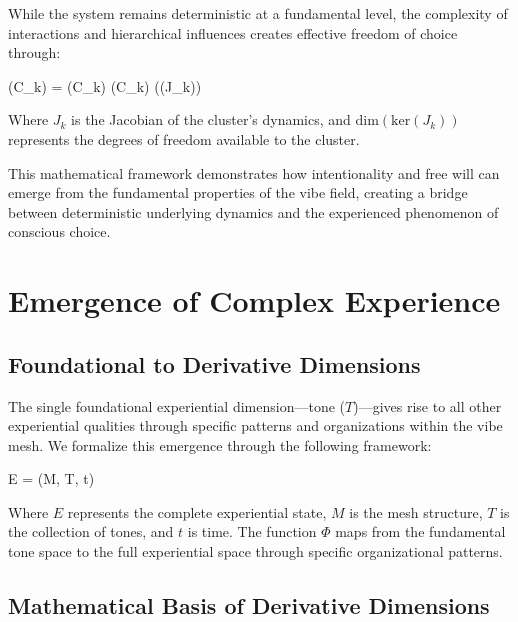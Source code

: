 \documentclass{article}
\let\oldequation\equation
\let\endoldequation\endequation
\renewenvironment{equation}{%
    \noindent\vspace{-\parskip}\vspace{-\baselineskip}%
    \oldequation
}{%
    \endoldequation
    \noindent\vspace{-\parskip}\vspace{-\baselineskip}%
}
\theoremstyle{definition}
\begin{document}
While the system remains deterministic at a fundamental level, the complexity of interactions and hierarchical influences creates effective freedom of choice through:

\begin{equation}
(C_k) = (C_k) \cdot {}(C_k) \cdot {}((J_k))
\end{equation}

Where $J_k$ is the Jacobian of the cluster's dynamics, and $\text{dim}(\text{ker}(J_k))$ represents the degrees of freedom available to the cluster.

This mathematical framework demonstrates how intentionality and free will can emerge from the fundamental properties of the vibe field, creating a bridge between deterministic underlying dynamics and the experienced phenomenon of conscious choice.

\section{Emergence of Complex Experience}

\subsection{Foundational to Derivative Dimensions}

The single foundational experiential dimension---tone ($T$)---gives rise to all other experiential qualities through specific patterns and organizations within the vibe mesh. We formalize this emergence through the following framework:

\begin{equation}
E = \Phi(M, T, t)
\end{equation}

Where $E$ represents the complete experiential state, $M$ is the mesh structure, $T$ is the collection of tones, and $t$ is time. The function $\Phi$ maps from the fundamental tone space to the full experiential space through specific organizational patterns.

\subsection{Mathematical Basis of Derivative Dimensions}
\end{document}
